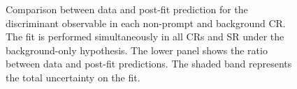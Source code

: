 \documentclass[../thesis.tex]{subfiles}
\begin{document}
\begin{figure}[!htbp]
\caption{\label{fig:results:bg_postfit}Comparison between data and post-fit prediction for the discriminant observable in each non-prompt and \ttW background \acs{CR}. The fit is performed simultaneously in all \acs{CR}s and \acs{SR} under the background-only hypothesis. The lower panel shows the ratio between data and post-fit predictions. The shaded band represents the total uncertainty on the fit.}
\end{figure}
\end{document}
